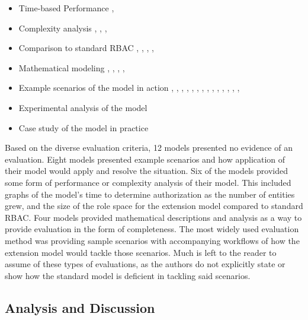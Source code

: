 \begin{itemize}
\setlength{\itemsep}{0.25pt}
\item Time-based Performance \cite{ni2010privacy}, \cite{aich09:role}
\item Complexity analysis \cite{bao08:role}, \cite{zhang06:collaborative}, \cite{chen08:spatio-temporal}, \cite{aich09:role}
\item Comparison to standard RBAC \cite{bao08:role}, \cite{zou2009crbac}, \cite{zhang06:collaborative}, \cite{zhao2008flexible}, \cite{ray07:spatio}
\item Mathematical modeling \cite{damian2007geo}, \cite{hansen2003spatial}, \cite{aich07:STARBAC}, \cite{chen08:spatio-temporal}, \cite{joshi05:generalized}
\item Example scenarios of the model in action \cite{alam06:constraint}, \cite{tzelepi01:flexible}, \cite{cholewka00:acontext-sensitive}, \cite{huang06:pervasive}, \cite{bao08:role}, \cite{jian2008extended}, \cite{yamazaki104:designing}, \cite{zou2009crbac}, \cite{ray07:spatio}, \cite{samuel07:spatio-temporal}, \cite{ray07:spatio}, \cite{joshi05:generalized}, \cite{yao2008task}, \cite{zhou2007team}, \cite{oh2003task}
\item Experimental analysis of the model
\item Case study of the model in practice \cite{motta03:contextual}
\end{itemize}

Based on the diverse evaluation criteria, 12 models presented no evidence of an evaluation. Eight models presented example scenarios
and how application of their model would apply and resolve the situation.  Six of the models provided some form of performance
or complexity analysis of their model.  This included graphs of the model's time to determine authorization as the number of entities
grew, and the size of the role space for the extension model compared to standard RBAC. Four models provided mathematical descriptions
and analysis as a way to provide evaluation in the form of completeness. 
The most widely used evaluation method was providing sample scenarios with accompanying workflows of how the extension model
would tackle those scenarios. Much is left to the reader to assume of these types of evaluations, as the authors do not explicitly state
or show how the standard model is deficient in tackling said scenarios.

\subsection{Analysis and Discussion}

